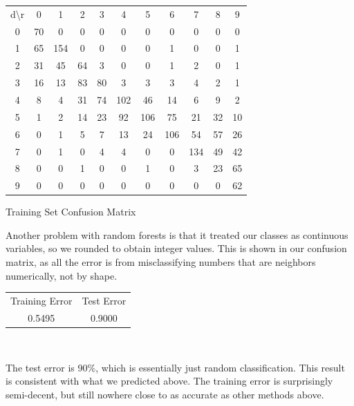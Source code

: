 \documentclass[10pt]{extarticle}
\begin{document}
\begin{minipage}{.55\textwidth}
\begin{center}
\begin{tabular}{c c c c c c c c c c c}
	 d\textbackslash r&0& 1& 2& 3& 4& 5& 6& 7& 8& 9\\
	 0&70& 0& 0& 0& 0& 0& 0& 0& 0& 0\\
	 1&65 &154& 0& 0& 0& 0& 1& 0& 0& 1\\
	 2&31&45&64& 3& 0& 0& 1& 2& 0& 1\\
	 3&16&13&83&80& 3& 3& 3& 4& 2& 1\\
	 4& 8& 4&31&74 &102&46&14& 6& 9& 2\\
	 5& 1& 2&14&23&92& 106&75&21&32&10\\
	 6& 0& 1& 5& 7&13&24& 106&54&57&26\\
	 7& 0& 1& 0& 4& 4& 0& 0& 134&49&42\\
	 8& 0& 0& 1& 0& 0& 1& 0& 3&23&65\\
	 9& 0& 0& 0& 0& 0& 0& 0& 0& 0&62
\end{tabular}
\bigskip
Training Set Confusion Matrix
\end{center}
\end{minipage}
\begin{minipage}{.4\textwidth}
Another problem with random forests is that it treated our classes as continuous variables, so we rounded to obtain integer values. This is shown in our confusion matrix, as all the error is from misclassifying numbers that are neighbors numerically, not by shape.
\begin{center}
	\begin{tabular}{c c}
		Training Error & Test Error\\
		0.5495 & 0.9000
	\end{tabular}
\end{center}
\end{minipage}\\
\begin{minipage}{.45\textwidth}
	The test error is 90\%, which is essentially just random classification. This result is consistent with what we predicted above. The training error is surprisingly semi-decent, but still nowhere close to as accurate as other methods above.
\end{minipage}
\begin{minipage}{.05\textwidth}
	\quad
\end{minipage}
\end{document}
